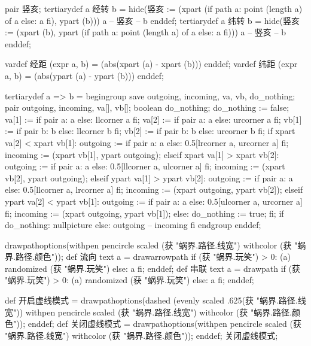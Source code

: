 \startMPinclusions[+]
pair 竖亥;
tertiarydef a 经转 b =
  hide(竖亥 := (xpart (if path a: point (length a) of a else: a fi), ypart (b)))
  a -- 竖亥 -- b
enddef;
tertiarydef a 纬转 b =
  hide(竖亥 := (xpart (b), ypart (if path a: point (length a) of a else: a fi)))
  a --  竖亥 -- b
enddef;
\stopMPinclusions

\startMPinclusions[+]
vardef 经距 (expr a, b) = (abs(xpart (a) - xpart (b))) enddef;
vardef 纬距 (expr a, b) = (abs(ypart (a) - ypart (b))) enddef;
\stopMPinclusions

\startMPinclusions[+]
tertiarydef a => b =
  begingroup
    save outgoing, incoming, va, vb, do_nothing;
    pair outgoing, incoming, va[], vb[];
    boolean do_nothing; do_nothing := false;
    va[1] := if pair a: a else: llcorner a fi;
    va[2] := if pair a: a else: urcorner a fi;
    vb[1] := if pair b: b else: llcorner b fi;
    vb[2] := if pair b: b else: urcorner b fi;
    if xpart va[2] < xpart vb[1]: %
      outgoing := if pair a: a else: 0.5[lrcorner a, urcorner a] fi;
      incoming  := (xpart vb[1], ypart outgoing);
    elseif xpart va[1] > xpart vb[2]: %
      outgoing := if pair a: a else: 0.5[llcorner a, ulcorner a] fi;
      incoming  := (xpart vb[2], ypart outgoing);
    elseif ypart va[1] > ypart vb[2]: %
      outgoing := if pair a: a else: 0.5[llcorner a, lrcorner a] fi;
      incoming  := (xpart outgoing, ypart vb[2]);
    elseif ypart va[2] < ypart vb[1]: %
      outgoing := if pair a: a else: 0.5[ulcorner a, urcorner a] fi;
      incoming  := (xpart outgoing, ypart vb[1]);
    else:
      do_nothing := true;
    fi;
    if do_nothing: nullpicture else: outgoing -- incoming fi
  endgroup
enddef;

drawpathoptions(withpen pencircle scaled (获 "蜗界.路径.线宽") withcolor (获 "蜗界.路径.颜色"));
def 流向 text a =
  drawarrowpath if (获 "蜗界.玩笑") > 0: (a) randomized (获 "蜗界.玩笑") else: a fi;
enddef;
def 串联 text a =
  drawpath if (获 "蜗界.玩笑") > 0: (a) randomized (获 "蜗界.玩笑") else: a fi;  
enddef;
\stopMPinclusions

\startMPinclusions[+]
def 开启虚线模式 =
  drawpathoptions(dashed (evenly scaled .625(获 "蜗界.路径.线宽"))
                  withpen pencircle scaled (获 "蜗界.路径.线宽")
                  withcolor (获 "蜗界.路径.颜色"));
enddef;
def 关闭虚线模式 =
  drawpathoptions(withpen pencircle scaled (获 "蜗界.路径.线宽")
                  withcolor (获 "蜗界.路径.颜色"));
enddef;
关闭虚线模式;
\stopMPinclusions

